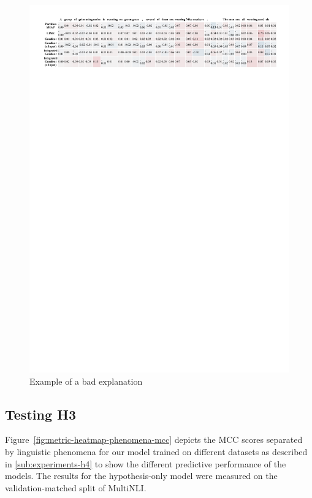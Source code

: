 \begin{figure}[h!]
    \centering
    \includegraphics[width=\textwidth]{./images/ferret_sample.pdf}
    \caption{Example of a bad explanation}
    \label{fig:ferret-sample}
\end{figure}

\subsection{Testing H3}
Figure~\ref{fig:metric-heatmap-phenomena-mcc} depicts the \ac{MCC} scores separated by linguistic phenomena for our model trained on different datasets as described in \autoref{sub:experiments-h4} to show the different predictive performance of the models. The results for the hypothesis-only model were measured on the validation-matched split of \ac{MultiNLI}.

